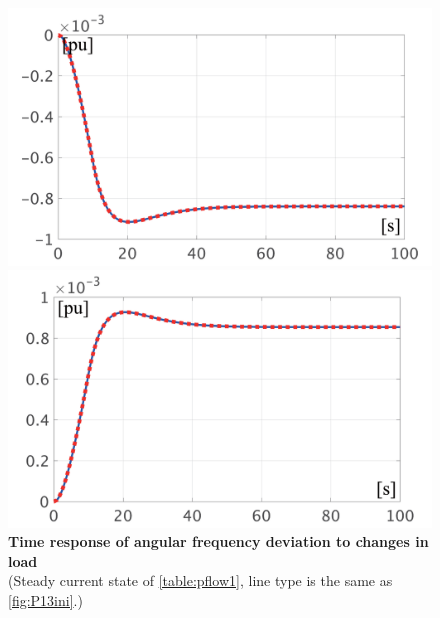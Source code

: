\documentclass[graybox, envcountchap]{svmult}
\begin{document}
\begin{figure}[t]
  \centering
  {
  \begin{minipage}{0.49\linewidth}
    \centering
    \includegraphics[width = 1.0\linewidth]{figs/P1mi}
  \end{minipage}
  \begin{minipage}{0.49\linewidth}
    \centering
    \includegraphics[width = 1.0\linewidth]{figs/P1pl}
  \end{minipage}
  \medskip
  \caption{\textbf{Time response of angular frequency deviation to changes in load}
  \\ \centering(Steady current state of \ref{table:pflow1}, line type is the same as \ref{fig:P13ini}.)}
  \label{fig:P1load}
  }
\medskip
\end{figure}
\end{document}

